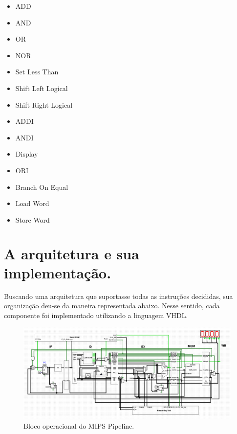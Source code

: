 \documentclass[a4paper, 11pt]{article}
\begin{document}
\begin{multicols}{4}
\begin{itemize}
        \item ADD
        \item AND
        \item OR 
        \item NOR
        \columnbreak
        \item Set Less Than
        \item Shift Left Logical
        \item Shift Right Logical
        \item ADDI
        \columnbreak
        \item ANDI
        \item Display
        \item ORI
        \columnbreak
        \item Branch On Equal
        \item Load Word
        \item Store Word
\end{itemize}
\end{multicols}

\section{A arquitetura e sua implementação.}
Buscando uma arquitetura que suportasse todas as instruções decididas, sua organização
deu-se da maneira representada abaixo. Nesse sentido, cada componente foi implementado
utilizando a linguagem VHDL.

\begin{figure}[h!]
    \centering
    \includegraphics[width=.9\linewidth]{arquitetura.png}
    \caption{Bloco operacional do MIPS Pipeline.}
\end{figure}
\end{document}
